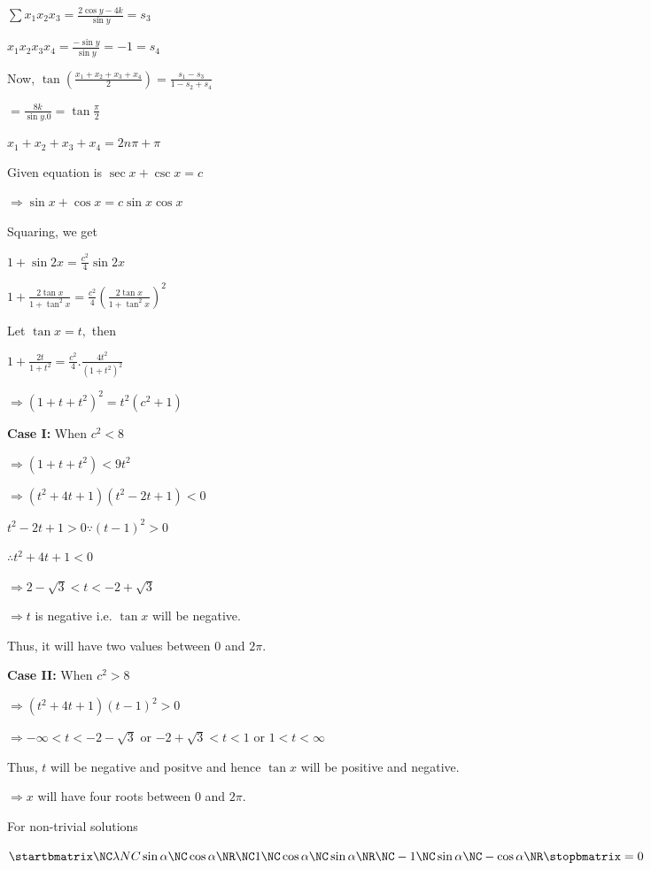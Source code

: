   $\sum x_1x_2x_3 = \frac{2\cos y - 4k}{\sin y} = s_3$

  $x_1x_2x_3x_4 = \frac{-\sin y}{\sin y} = -1 = s_4$

  Now, $\tan\left(\frac{x_1 + x_2 + x_3 + x_4}{2}\right) = \frac{s_1 - s_3}{1 - s_2 + s_4}$

  $= \frac{8k}{\sin y.0} = \tan\frac{\pi}{2}$

  $x_1 + x_2 + x_3 + x_4 = 2n\pi + \pi$

\item Given equation is $\sec x + \csc x = c$

  $\Rightarrow \sin x + \cos x = c\sin x\cos x$

  Squaring, we get

  $1 + \sin2x = \frac{c^2}{4}\sin2x$

  $1 + \frac{2\tan x}{1 + \tan^2x} = \frac{c^2}{4}\left(\frac{2\tan x}{1 + \tan^2x}\right)^2$

  Let $\tan x = t,$ then

  $1 + \frac{2t}{1 + t^2} = \frac{c^2}{4}.\frac{4t^2}{(1 + t^2)^2}$

  $\Rightarrow (1 + t + t^2)^2 = t^2(c^2 + 1)$

  {\bf Case I:} When $c^2< 8$

  $\Rightarrow (1 + t + t^2) < 9t^2$

  $\Rightarrow (t^2 + 4t + 1)(t^2 - 2t + 1) < 0$

  $t^2 - 2t + 1 > 0 \because (t - 1)^2 > 0$

  $\therefore t^2 + 4t + 1 < 0$

  $\Rightarrow 2 - \sqrt{3}< t < -2 + \sqrt{3}$

  $\Rightarrow t$ is negative i.e. $\tan x$ will be negative.

  Thus, it will have two values between $0$ and $2\pi.$

  {\bf Case II:} When $c^2 > 8$

  $\Rightarrow (t^2 + 4t + 1)(t - 1)^2 > 0$

  $\Rightarrow -\infty < t < -2 -\sqrt{3}$ or $-2 + \sqrt{3}< t< 1$ or $1< t< \infty$

  Thus, $t$ will be negative and positve and hence $\tan x$ will be positive and negative.

  $\Rightarrow x$ will have four roots between $0$ and $2\pi.$

\item For non-trivial solutions

  $\startbmatrix\NC\lambda NC \sin\alpha \NC \cos\alpha \NR\NC 1 \NC \cos\alpha \NC \sin\alpha \NR\NC -1 \NC \sin\alpha \NC
  -\cos\alpha\NR\stopbmatrix = 0$

